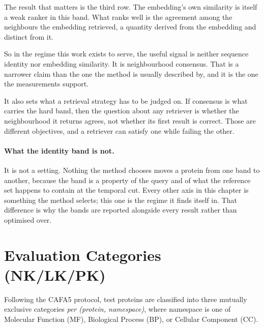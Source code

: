 The result that matters is the third row. The embedding's own similarity is
itself a weak ranker in this band. What ranks well is the agreement among
the neighbours the embedding retrieved, a quantity derived from the
embedding and distinct from it.

So in the regime this work exists to serve, the useful signal is neither
sequence identity nor embedding similarity. It is neighbourhood consensus.
That is a narrower claim than the one the method is usually described by,
and it is the one the measurements support.

It also sets what a retrieval strategy has to be judged on. If consensus is
what carries the hard band, then the question about any retriever is
whether the neighbourhood it returns agrees, not whether its first result
is correct. Those are different objectives, and a retriever can satisfy one
while failing the other.

\paragraph{What the identity band is not.}
It is not a setting. Nothing the method chooses moves a protein from one
band to another, because the band is a property of the query and of what
the reference set happens to contain at the temporal cut. Every other axis
in this chapter is something the method selects; this one is the regime it
finds itself in. That difference is why the bands are reported alongside
every result rather than optimised over.

\section{Evaluation Categories (NK/LK/PK)}
\label{subsec:nk-lk-pk}

Following the CAFA5 protocol, test proteins are classified into three
mutually exclusive categories \emph{per (protein, namespace)}, where namespace
is one of Molecular Function (MF), Biological Process (BP), or Cellular
Component (CC).

